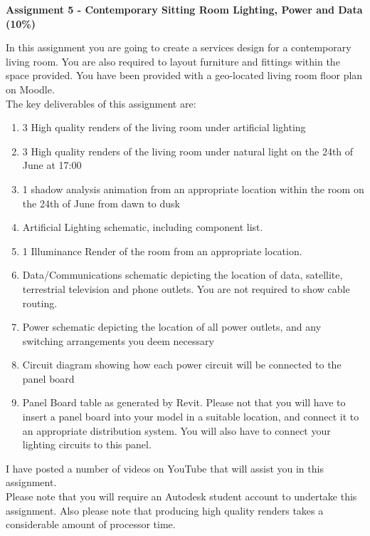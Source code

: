
	
\begin{flushleft}
\Large\textbf{Assignment 5 - Contemporary Sitting Room Lighting, Power and Data (10\%)}\\
\end{flushleft}

In this assignment you are going to create a services design for a contemporary living room.  You are also required to layout furniture and fittings within the space provided.  You have been provided with a geo-located living room floor plan on Moodle.\\

The key deliverables of this assignment are:

\begin{enumerate}
	\item 3 High quality renders of the living room under artificial lighting
	\item 3 High quality renders of the living room under natural light on the 24th of June at 17:00
	\item 1 shadow analysis animation from an appropriate location within the room on the 24th of June from dawn to dusk
	\item Artificial Lighting schematic, including component list.
	\item 1 Illuminance Render of the room from an appropriate location.
	\item Data/Communications schematic depicting the location of data, satellite, terrestrial television and phone outlets.  You are not required to show cable routing.
	\item Power schematic depicting the location of all power outlets, and any switching arrangements you deem necessary
	\item Circuit diagram showing how each power circuit will be connected to the panel board
	\item Panel Board table as generated by Revit.  Please not that you will have to insert a panel board into your model in a suitable location, and connect it to an appropriate distribution system.  You will also have to connect your lighting circuits to this panel.
\end{enumerate}

I have posted a number of videos on YouTube that will assist you in this assignment.\\

Please note that you will require an Autodesk student account to undertake this assignment.  Also please note that producing high quality renders takes a considerable amount of processor time.\\

